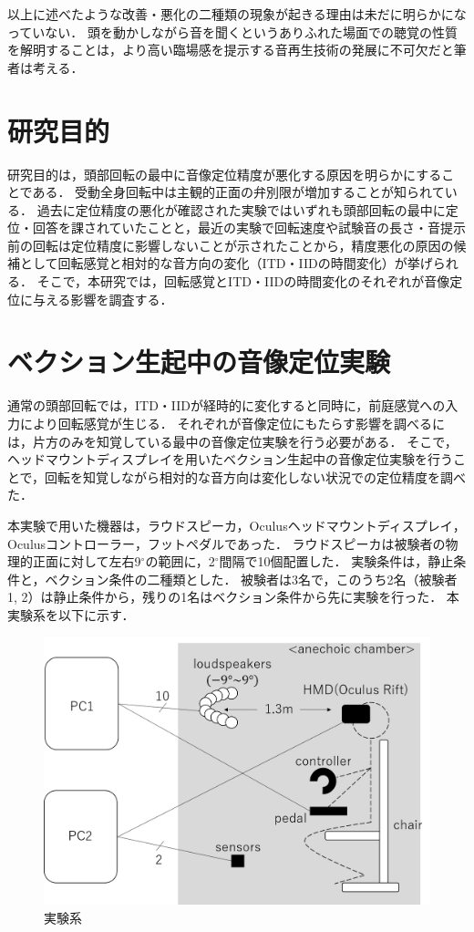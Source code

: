 \documentclass[12pt,a4j]{jsarticle}
\renewcommand{\ }{\hspace{1zw}}
\begin{document}
以上に述べたような改善・悪化の二種類の現象が起きる理由は未だに明らかになっていない．
頭を動かしながら音を聞くというありふれた場面での聴覚の性質を解明することは，より高い臨場感を提示する音再生技術の発展に不可欠だと筆者は考える．

\section{研究目的}
研究目的は，頭部回転の最中に音像定位精度が悪化する原因を明らかにすることである．
受動全身回転中は主観的正面の弁別限が増加することが知られている．
過去に定位精度の悪化が確認された実験ではいずれも頭部回転の最中に定位・回答を課されていたことと，最近の実験で回転速度や試験音の長さ・音提示前の回転は定位精度に影響しないことが示されたことから，精度悪化の原因の候補として回転感覚と相対的な音方向の変化（ITD・IIDの時間変化）が挙げられる．
そこで，本研究では，回転感覚とITD・IIDの時間変化のそれぞれが音像定位に与える影響を調査する．

\section{ベクション生起中の音像定位実験}
通常の頭部回転では，ITD・IIDが経時的に変化すると同時に，前庭感覚への入力により回転感覚が生じる．
それぞれが音像定位にもたらす影響を調べるには，片方のみを知覚している最中の音像定位実験を行う必要がある．
そこで，ヘッドマウントディスプレイを用いたベクション生起中の音像定位実験を行うことで，回転を知覚しながら相対的な音方向は変化しない状況での定位精度を調べた．

本実験で用いた機器は，ラウドスピーカ，Oculusヘッドマウントディスプレイ，Oculusコントローラー，フットペダルであった．
ラウドスピーカは被験者の物理的正面に対して左右9$^\circ$の範囲に，2$^\circ$間隔で10個配置した．
実験条件は，静止条件と，ベクション条件の二種類とした．
被験者は3名で，このうち2名（被験者1, 2）は静止条件から，残りの1名はベクション条件から先に実験を行った．
本実験系を以下に示す．
\begin{figure}[htbp]
    \centering
    \includegraphics[width=0.8\columnwidth]{./figure/system.png}
    \caption{実験系}
    \label{system}
\end{figure}
\end{document}
